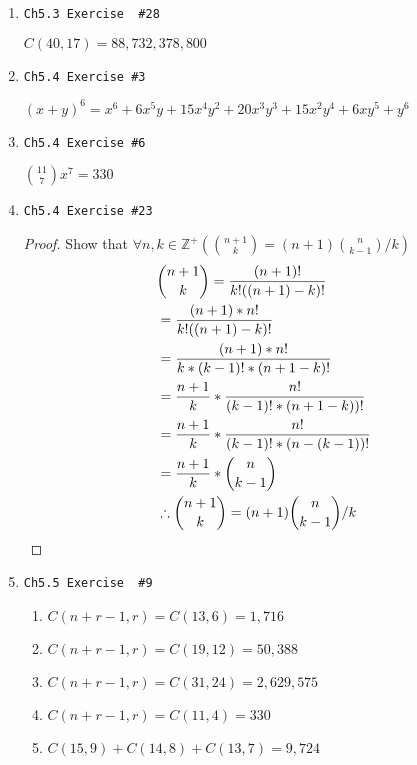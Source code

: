 \documentclass[11pt]{article}
\begin{document}
\begin{enumerate}
    \item \begin{verbatim}Ch5.3 Exercise  #28\end{verbatim}
        $C(40,17) = 88,732,378,800$
    \item \begin{verbatim}Ch5.4 Exercise #3\end{verbatim}
        $(x+y)^6 = x^6 + 6x^5y + 15x^4y^2 + 20x^3y^3 + 15x^2y^4 + 6xy^5 + y^6$
    \item \begin{verbatim}Ch5.4 Exercise #6\end{verbatim}
        $\binom{11}{7}x^7 = 330$
    \item \begin{verbatim}Ch5.4 Exercise #23\end{verbatim}
        \begin{proof}
            Show that $\forall n,k \in \mathbb{Z}^+ (\binom{n+1}{k} = (n+1)\binom{n}{k-1}/k)$
            \begin{align*}
                & \binom{n+1}{k} = \frac{(n+1)!}{k!((n+1)-k)!} \\
                & = \frac{(n+1)*n!}{k!((n+1)-k)!} \\
                & = \frac{(n+1)*n!}{k*(k-1)!*(n+1-k)!} \\
                & = \frac{n+1}{k} * \frac{n!}{(k-1)!*(n+1-k))!} \\
                & = \frac{n+1}{k} * \frac{n!}{(k-1)!*(n-(k-1))!} \\
                & = \frac{n+1}{k} * \binom{n}{k-1} \\
                & \therefore  \binom{n+1}{k} = (n+1)\binom{n}{k-1}/k \qedhere
            \end{align*}
        \end{proof}
    \item \begin{verbatim}Ch5.5 Exercise  #9\end{verbatim}
        \begin{enumerate}
            \item $ C(n+r-1,r) = C(13, 6) = 1,716$
            \item $ C(n+r-1,r) = C(19, 12) = 50,388$
            \item $ C(n+r-1,r) = C(31, 24) = 2,629,575$
            \item $ C(n+r-1,r) = C(11, 4) = 330$
            \item $ C(15,9) + C(14,8) + C(13,7) = 9,724$
        \end{enumerate}


\end{enumerate}
\end{document}
